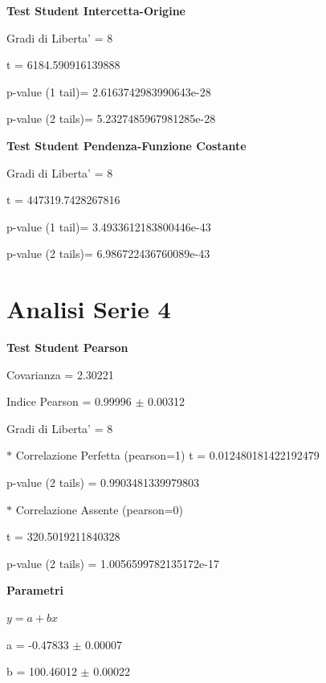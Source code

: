 \documentclass{article}
\begin{document}
\textbf{Test Student Intercetta-Origine}

Gradi di Liberta' = 8

t = 6184.590916139888

p-value (1 tail)= 2.6163742983990643e-28

p-value (2 tails)= 5.2327485967981285e-28

\textbf{Test Student Pendenza-Funzione Costante}

Gradi di Liberta' = 8

t = 447319.7428267816

p-value (1 tail)= 3.4933612183800446e-43

p-value (2 tails)= 6.986722436760089e-43

\section*{Analisi Serie 4}

\textbf{Test Student Pearson}

Covarianza = 2.30221

Indice Pearson = 0.99996 $\pm$ 0.00312

Gradi di Liberta' = 8

$\ast$ Correlazione Perfetta (pearson=1)
t = 0.012480181422192479

p-value (2 tails) = 0.9903481339979803

$\ast$ Correlazione Assente (pearson=0)

t = 320.5019211840328

p-value (2 tails) = 1.0056599782135172e-17

\textbf{Parametri}

$y = a + bx$

a = -0.47833 $\pm$ 0.00007

b = 100.46012 $\pm$ 0.00022
\end{document}
